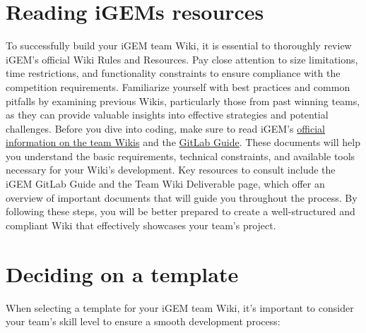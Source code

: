 
    \section{Reading iGEMs resources} \label{sec:reading-igem-resources}
    To successfully build your iGEM team Wiki, it is essential to thoroughly review iGEM’s official Wiki Rules and Resources. 
    Pay close attention to size limitations, time restrictions, and functionality constraints to ensure compliance with the competition requirements. 
    Familiarize yourself with best practices and common pitfalls by examining previous Wikis, particularly those from past winning teams, as they can provide valuable insights into effective strategies and potential challenges. \newline
    Before you dive into coding, make sure to read iGEM’s \href{https://competition.igem.org/deliverables/team-Wiki}{official information on the team Wikis} and the \href{https://competition.igem.org/deliverables/gitlab-guide}{GitLab Guide}.
    These documents will help you understand the basic requirements, technical constraints, and available tools necessary for your Wiki's development. 
    Key resources to consult include the iGEM GitLab Guide and the Team Wiki Deliverable page, which offer an overview of important documents that will guide you throughout the process. \newline
    By following these steps, you will be better prepared to create a well-structured and compliant Wiki that effectively showcases your team’s project.


    \section{Deciding on a template } \label{sec:template-decision}
    When selecting a template for your iGEM team Wiki, it’s important to consider your team’s skill level to ensure a smooth development process:

